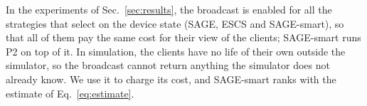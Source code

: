 In the experiments of Sec.~\ref{sec:results}, the broadcast is enabled for all
the strategies that select on the device state (SAGE, ESCS and SAGE-smart), so
that all of them pay the same cost for their view of the clients; SAGE-smart
runs P2 on top of it. In simulation, the clients have no life of their own
outside the simulator, so the broadcast cannot return anything the simulator
does not already know. We use it to charge its cost, and SAGE-smart ranks with
the estimate of Eq.~\eqref{eq:estimate}.
